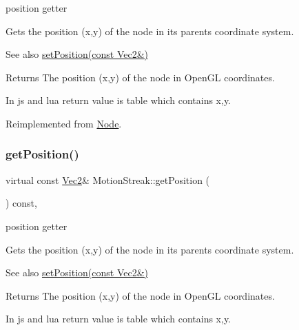 position getter 

Gets the position (x,y) of the node in its parent\textquotesingle{}s coordinate system.

\begin{DoxySeeAlso}{See also}
\hyperlink{classMotionStreak_a2d7df706b1ec462093363d18fd0baf58}{set\+Position(const Vec2\&)}
\end{DoxySeeAlso}
\begin{DoxyReturn}{Returns}
The position (x,y) of the node in Open\+GL coordinates. 
\begin{DoxyCode}
In js and lua \textcolor{keywordflow}{return} value is table which contains x,y.
\end{DoxyCode}
 
\end{DoxyReturn}


Reimplemented from \hyperlink{classNode_a1c78c6feace91b27b6cbb12ee16e8eb0}{Node}.

\mbox{\label{classMotionStreak_a73f3dcb75380855a39c6ff9eee475d80}} 
\subsubsection{\texorpdfstring{get\+Position()}{getPosition()}\hspace{0.1cm}{\footnotesize\ttfamily [2/4]}}
{\footnotesize\ttfamily virtual const \hyperlink{classVec2}{Vec2}\& Motion\+Streak\+::get\+Position (\begin{DoxyParamCaption}{ }\end{DoxyParamCaption}) const\hspace{0.3cm}{\ttfamily [override]}, {\ttfamily [virtual]}}



position getter 

Gets the position (x,y) of the node in its parent\textquotesingle{}s coordinate system.

\begin{DoxySeeAlso}{See also}
\hyperlink{classMotionStreak_a2d7df706b1ec462093363d18fd0baf58}{set\+Position(const Vec2\&)}
\end{DoxySeeAlso}
\begin{DoxyReturn}{Returns}
The position (x,y) of the node in Open\+GL coordinates. 
\begin{DoxyCode}
In js and lua \textcolor{keywordflow}{return} value is table which contains x,y.
\end{DoxyCode}
 
\end{DoxyReturn}


